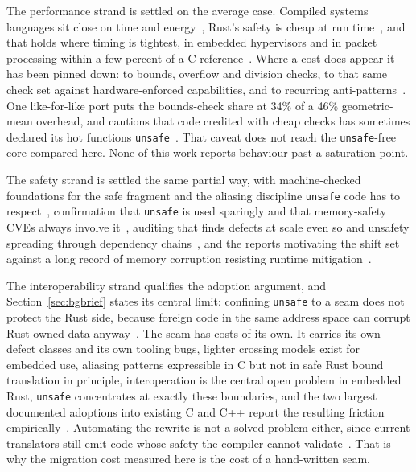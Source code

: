 \documentclass[english,oneside,a4paper,censored,csm,software-track-2020]{HYthesisML}
\begin{document}
\begin{appendices}
The performance strand is settled on the average case. Compiled systems languages sit close on
time and energy~\cite{bugden2022rust,pereira2017energy}, Rust's safety is cheap at run
time~\cite{balasubramanian2017rust,levy2017kernel}, and that holds where timing is tightest, in
embedded hypervisors and in packet processing within a few percent of a C
reference~\cite{mo2023rustshyper,emmerich2019drivers,xiao2024rpkt}.
Where a cost does appear it has been pinned down: to bounds, overflow and division checks, to
that same check set against hardware-enforced capabilities, and to recurring
anti-patterns~\cite{zhang2022runtime,harris2023morello,cui2025perfbugs}. One like-for-like port
puts the bounds-check share at 34\% of a 46\% geometric-mean overhead, and cautions that code
credited with cheap checks has sometimes declared its hot functions
\texttt{unsafe}~\cite{naylor2026cherisimt}. That caveat does not reach the \texttt{unsafe}-free
core compared here. None of this work reports behaviour past a saturation point.

The safety strand is settled the same partial way, with machine-checked foundations for the
safe fragment and the aliasing discipline \texttt{unsafe} code has to
respect~\cite{jung2018rustbelt,jung2021safe,jung2020stacked}, confirmation that \texttt{unsafe} is
used sparingly and that memory-safety CVEs always involve
it~\cite{qin2020rust,astrauskas2020unsafe,xu2021rustcve}, auditing that finds defects at scale even
so and unsafety spreading through dependency
chains~\cite{bae2021rudra,zheng2024security,qin2024safety,evans2020rust}, and the reports
motivating the shift set against a long record of memory corruption resisting runtime
mitigation~\cite{msrc2019memory,google2022android,google2024securebydesign,cisa2023memorysafe,oncd2024building,szekeres2013sok}.

The interoperability strand qualifies the adoption argument, and Section~\ref{sec:bgbrief}
states its central limit: confining \texttt{unsafe} to a seam does not protect the Rust side,
because foreign code in the same address space can corrupt Rust-owned data
anyway~\cite{rivera2021galeed,kirth2022pkrusafe}. The seam has costs of its own. It carries its
own defect classes and its own tooling bugs, lighter crossing models exist for embedded use,
aliasing patterns expressible in C but not in safe Rust bound translation in principle,
interoperation is the central open problem in embedded Rust, \texttt{unsafe} concentrates at
exactly these boundaries, and the two largest documented adoptions into existing C and C++ report
the resulting friction
empirically~\cite{li2022crosslang,cai2026interop,schuermann2023encapsulated,emre2023aliasing,sharma2024embedded,mccormack2026unsafe,li2026rustlinux,fan2026android}.
Automating the rewrite is not a solved problem either, since current translators still emit code
whose safety the compiler cannot validate~\cite{hong2025ctorust}. That is why the migration cost
measured here is the cost of a hand-written seam.


\end{appendices}
\end{document}
